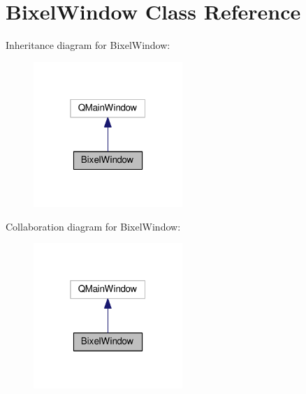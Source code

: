 \hypertarget{classBixelWindow}{\section{Bixel\-Window Class Reference}
\label{classBixelWindow}
}


Inheritance diagram for Bixel\-Window\-:\nopagebreak
\begin{figure}[H]
\begin{center}
\leavevmode
\includegraphics[width=160pt]{classBixelWindow__inherit__graph}
\end{center}
\end{figure}


Collaboration diagram for Bixel\-Window\-:\nopagebreak
\begin{figure}[H]
\begin{center}
\leavevmode
\includegraphics[width=160pt]{classBixelWindow__coll__graph}
\end{center}
\end{figure}
